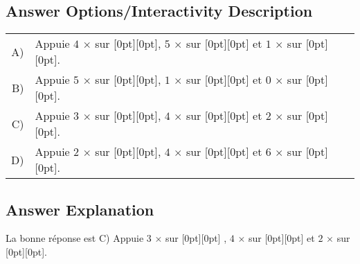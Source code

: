 \documentclass[a4paper,11pt]{report}
\newcommand{\taskGraphicsFolder}{..}
\begin{document}
\begingroup
\renewcommand{\arraystretch}{1.5}
\subsection*{Answer Options/Interactivity Description}

\begin{tabularx}{\columnwidth}{ @{} r L @{} }
  A) & Appuie $4$ \ensuremath{\times} sur \raisebox{-0.5ex}[0pt][0pt]{}, $5$ \ensuremath{\times} sur \raisebox{-0.5ex}[0pt][0pt]{} et $1$ \ensuremath{\times} sur \raisebox{-0.5ex}[0pt][0pt]{}. \\ 
  B) & Appuie $5$ \ensuremath{\times} sur \raisebox{-0.5ex}[0pt][0pt]{}, $1$ \ensuremath{\times} sur \raisebox{-0.5ex}[0pt][0pt]{} et $0$ \ensuremath{\times} sur \raisebox{-0.5ex}[0pt][0pt]{}. \\ 
  C) & Appuie $3$ \ensuremath{\times} sur \raisebox{-0.5ex}[0pt][0pt]{}, $4$ \ensuremath{\times} sur \raisebox{-0.5ex}[0pt][0pt]{} et $2$ \ensuremath{\times} sur \raisebox{-0.5ex}[0pt][0pt]{}. \\ 
  D) & Appuie $2$ \ensuremath{\times} sur \raisebox{-0.5ex}[0pt][0pt]{}, $4$ \ensuremath{\times} sur \raisebox{-0.5ex}[0pt][0pt]{} et $6$ \ensuremath{\times} sur \raisebox{-0.5ex}[0pt][0pt]{}.
\end{tabularx}

\endgroup

\subsection*{Answer Explanation}

La bonne réponse est C) Appuie $3$ \ensuremath{\times} sur \raisebox{-0.5ex}[0pt][0pt]{} , $4$ \ensuremath{\times} sur \raisebox{-0.5ex}[0pt][0pt]{} et $2$ \ensuremath{\times} sur \raisebox{-0.5ex}[0pt][0pt]{}.
\end{document}
